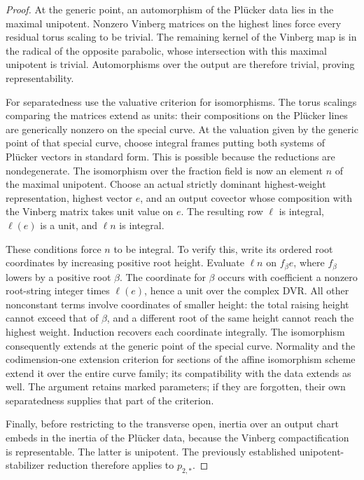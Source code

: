 \begin{proof}
At the generic point, an automorphism of the Pl\"ucker data
lies in the maximal unipotent.  Nonzero Vinberg matrices on
the highest lines force every residual torus scaling to be
trivial.  The remaining kernel of the Vinberg map is in the
radical of the opposite parabolic, whose intersection with
this maximal unipotent is trivial.  Automorphisms over the
output are therefore trivial, proving representability.

For separatedness use the valuative criterion for isomorphisms.
The torus scalings comparing the matrices extend as units:
their compositions on the Pl\"ucker lines are generically
nonzero on the special curve.  At the valuation given by the
generic point of that special curve, choose integral frames
putting both systems of Pl\"ucker vectors in standard form.
This is possible because the reductions are nondegenerate.
The isomorphism over the fraction field is now an element
$n$ of the maximal unipotent.  Choose an actual strictly
dominant highest-weight representation, highest vector $e$,
and an output covector whose composition with the Vinberg
matrix takes unit value on $e$.  The resulting row $\ell$
is integral, $\ell(e)$ is a unit, and $\ell n$ is integral.

These conditions force $n$ to be integral.  To verify this,
write its ordered root coordinates by increasing positive
root height.  Evaluate $\ell n$ on $f_\beta e$, where
$f_\beta$ lowers by a positive root $\beta$.  The coordinate
for $\beta$ occurs with coefficient a nonzero root-string
integer times $\ell(e)$, hence a unit over the complex DVR.
All other nonconstant terms involve coordinates of smaller
height: the total raising height cannot exceed that of
$\beta$, and a different root of the same height cannot
reach the highest weight.  Induction recovers each
coordinate integrally.  The isomorphism consequently
extends at the generic point of the special curve.
Normality and the codimension-one extension criterion for
sections of the affine isomorphism scheme extend it over
the entire curve family; its compatibility with the data
extends as well.  The argument retains marked parameters;
if they are forgotten, their own separatedness supplies
that part of the criterion.

Finally, before restricting to the transverse open, inertia
over an output chart embeds in the inertia of the
Pl\"ucker data, because the Vinberg compactification is
representable.  The latter is unipotent.  The previously
established unipotent-stabilizer reduction therefore
applies to $p_{2,*}$.
\end{proof}

